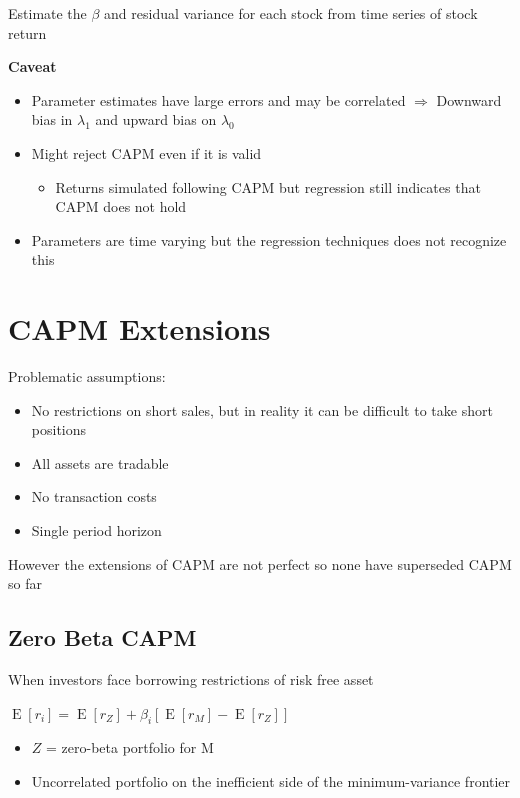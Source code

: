 \documentclass[]{book}
\providecommand{\tightlist}{%
  \setlength{\itemsep}{0pt}\setlength{\parskip}{0pt}}
\theoremstyle{definition}
\theoremstyle{definition}
\theoremstyle{remark}
\begin{document}
Estimate the \(\beta\) and residual variance for each stock from time
series of stock return

 \textbf{Caveat}

\begin{itemize}
\item
  Parameter estimates have large errors and may be correlated
  \(\Rightarrow\) Downward bias in \(\lambda_1\) and upward bias on
  \(\lambda_0\)
\item
  Might reject CAPM even if it is valid

  \begin{itemize}
  \tightlist
  \item
    Returns simulated following CAPM but regression still indicates that
    CAPM does not hold
  \end{itemize}
\item
  Parameters are time varying but the regression techniques does not
  recognize this
\end{itemize}

\section{CAPM Extensions}\label{capm-extensions}

Problematic assumptions:

\begin{itemize}
\item
  No restrictions on short sales, but in reality it can be difficult to
  take short positions
\item
  All assets are tradable
\item
  No transaction costs
\item
  Single period horizon
\end{itemize}

However the extensions of CAPM are not perfect so none have superseded
CAPM so far

\subsection{Zero Beta CAPM}\label{zero-beta-capm}

When investors face borrowing restrictions of risk free asset

\(\operatorname{E}[r_i] = \operatorname{E}[r_Z] + \beta_i \left[\operatorname{E}[r_M] - \operatorname{E}[r_Z]\right]\)

\begin{itemize}
\item
  \(Z\) = zero-beta portfolio for M
\item
  Uncorrelated portfolio on the inefficient side of the minimum-variance
  frontier
\end{itemize}
\end{document}
